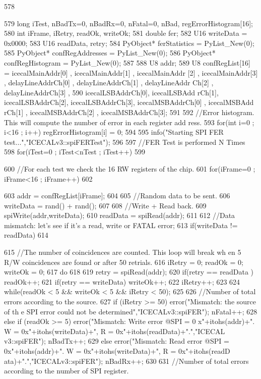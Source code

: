 \begin{DoxyCode}
578 {
579     long iTest, nBadTx=0, nBadRx=0, nFatal=0, nBad, regErrorHistogram[16];
580     int iFrame, iRetry, readOk, writeOk;
581     double fer;
582     U16 writeData = 0x0000;
583     U16 readData, retry;
584     PyObject* ferStatistics         = PyList_New(0); 
585     PyObject* confRegAddresses  = PyList_New(0);
586     PyObject* confRegHistogram  = PyList_New(0);
587 
588     U8  addr;
589     U8  confRegList[16] = {icecalMainAddr[0] , icecalMainAddr[1] , icecalMainAddr
      [2] , icecalMainAddr[3] , delayLineAddrCh[0] , delayLineAddrCh[1] , delayLineAddr
      Ch[2] , delayLineAddrCh[3] ,
590                                                  icecalLSBAddrCh[0], icecalLSBAdd
      rCh[1], icecalLSBAddrCh[2], icecalLSBAddrCh[3], icecalMSBAddrCh[0] , icecalMSBAdd
      rCh[1] , icecalMSBAddrCh[2] , icecalMSBAddrCh[3]};
591 
592     //Error histogram. This will compute the number of error in each register add
      ress.
593     for(int i=0 ; i<16 ; i++) regErrorHistogram[i] = 0;
594 
595     info("Starting SPI FER test...","ICECALv3::spiFERTest");
596 
597     //FER Test is performed N Times
598     for(iTest=0 ; iTest<nTest ; iTest++)
599     {
600         //For each test we check the 16 RW registers of the chip.
601         for(iFrame=0 ; iFrame<16 ; iFrame++)
602         {
603             addr = confRegList[iFrame];
604 
605             //Random data to be sent.
606             writeData = rand() + rand();
607 
608             //Write + Read back.    
609             spiWrite(addr,writeData);
610             readData = spiRead(addr);   
611 
612             //Data mismatch: let's see if it's a read, write or FATAL error;
613             if(writeData != readData)
614             {
615                 //The number of coincidences are counted. This loop will break wh
      en 5 R/W coincidences are found or after 50 retrials.
616                 iRetry = 0;     readOk = 0;         writeOk = 0;
617                 do
618                 {
619                     retry = spiRead(addr);
620                     if(retry == readData )  readOk++;
621                     if(retry == writeData) writeOk++;
622                     iRetry++;
623                 }
624                 while(readOk < 5 && writeOk < 5 && iRetry < 50);
625 
626                 //Number of total errors according to the source.
627                 if          (iRetry >= 50) {    error("Mismatch: the source of th
      e SPI error could not be determined","ICECALv3::spiFER");   nFatal++;   }
628                 else if (readOk >= 5)    {  error("Mismatch: Write error @SPI = 0
      x"+itohs(addr)+". W = 0x"+itohs(writeData)+", R = 0x"+itohs(readData)+".","ICECAL
      v3::spiFER");   nBadTx++;   }
629                 else                                     {  error("Mismatch: Read
       error @SPI = 0x"+itohs(addr)+".  W = 0x"+itohs(writeData)+", R = 0x"+itohs(readD
      ata)+".","ICECALv3::spiFER");       nBadRx++;   }
630 
631                 //Number of total errors according to the number of SPI register.
      
}}}}
\end{DoxyCode}
